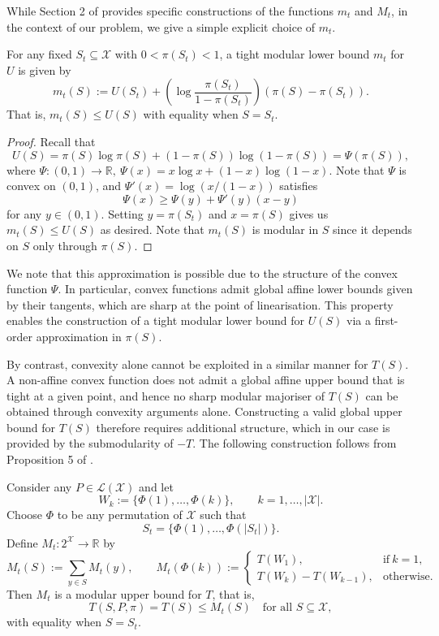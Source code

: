 \documentclass[EJP]{ejpecp} %
\begin{document}
While Section 2 of \cite{iyer2013algorithmsapproximateminimizationdifference} provides specific constructions of the functions $m_t$ and $M_t$, in the context of our problem, we give a simple explicit choice of $m_t$.

\begin{proposition} \label{prop:U_lower}
    For any fixed $S_t \subseteq \mathcal{X}$ with $0 < \pi(S_t) < 1$, a tight modular lower bound $m_t$ for $U$ is given by
    $$m_t(S) := U(S_t) + \left(\log \frac{\pi(S_t)}{1-\pi(S_t)}\right) \left(\pi(S) - \pi(S_t)\right).$$
    That is, $m_t(S) \leq U(S)$ with equality when $S = S_t$.
\end{proposition}

\begin{proof}
    Recall that 
    $$U(S) = \pi(S)\log \pi(S) + (1-\pi(S))\log (1-\pi(S)) = \Psi(\pi(S)),$$
    where $\Psi: (0,1) \to \mathbb{R},\ \Psi(x) = x\log x + (1-x)\log (1-x).$ Note that $\Psi$ is convex on $(0,1)$, and $\Psi'(x) = \log(x/(1-x))$ satisfies
    $$\Psi(x) \geq \Psi(y) + \Psi'(y)(x-y)$$
    for any $y \in (0,1).$
    Setting $y = \pi(S_t)$ and $x = \pi(S)$ gives us $m_t(S) \leq U(S)$ as desired. Note that $m_t(S)$ is modular in $S$ since it depends on $S$ only through $\pi(S)$.
\end{proof}

We note that this approximation is possible due to the structure of the convex function $\Psi$. In particular, convex functions admit global affine lower bounds given by their tangents, which are sharp at the point of linearisation. This property enables the construction of a tight modular lower bound for $U(S)$ via a first-order approximation in $\pi(S)$.

By contrast, convexity alone cannot be exploited in a similar manner for $T(S)$. A non-affine convex function does not admit a global affine upper bound that is tight at a given point, and hence no sharp modular majoriser of $T(S)$ can be obtained through convexity arguments alone. Constructing a valid global upper bound for $T(S)$ therefore requires additional structure, which in our case is provided by the submodularity of $-T$. The following construction follows from Proposition 5 of \cite{Bilmes_subsup}.

\begin{proposition} \label{prop:T_upper}
    Consider any $P \in \mathcal{L}(\mathcal{X})$ and let 
    $$W_k := \{\Phi(1),\dots,\Phi(k)\}, \qquad k=1,\dots,|\mathcal X|.$$ Choose $\Phi$ to be any permutation of $\mathcal{X}$ such that 
    $$S_t = \{\Phi(1),\dots,\Phi(|S_t|)\}.$$
    Define $M_t : 2^{\mathcal X} \to \mathbb{R}$ by 
    $$M_t(S) :=\sum_{y\in S} M_t(y), \qquad M_t(\Phi(k)) := \begin{cases}
        T(W_1), & \mathrm{if}\ k = 1,\\
        T(W_k) - T(W_{k-1}), & \mathrm{otherwise}.
    \end{cases}$$
    Then $M_t$ is a modular upper bound for $T$, that is,
    $$T(S,P, \pi) = T(S)  \leq M_t(S) \quad \text{for all } S \subseteq \mathcal X,$$
    with equality when $S=S_t$. 
\end{proposition}
\end{document}
